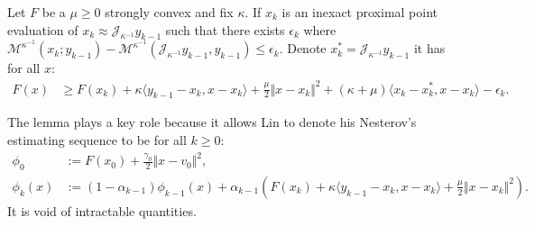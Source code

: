 \documentclass[12pt]{article}
\begin{document}
    \begin{lemma}\label{lemma:lin-ixct-prox-ineq}
        Let $F$ be a $\mu\ge 0$ strongly convex and fix $\kappa$. 
        If $x_k$ is an inexact proximal point evaluation of $x_k \approx \mathcal J_{\kappa^{-1}} y_{k - 1}$ such that there exists $\epsilon_k$ where $\mathcal M^{\kappa^{-1}}(x_k; y_{k - 1}) - \mathcal M^{\kappa^{-1}}(\mathcal J_{\kappa^{-1}} y_{k - 1}, y_{k - 1}) \le \epsilon_k$. 
        Denote $x_k^* = \mathcal J_{\kappa^{-1}} y_{k - 1}$ it has for all $x$: 
        \begin{align*}
            F(x) &\ge 
            F(x_k) + \kappa \langle y_{k - 1} - x_k, x - x_k\rangle
            + \frac{\mu}{2}\Vert x - x_k\Vert^2 
            + (\kappa + \mu)\langle  x_k - x_k^*, x - x_k\rangle 
            - \epsilon_k.
        \end{align*}
    \end{lemma}
    \begin{remark}
        The lemma plays a key role because it allows Lin to denote his Nesterov's estimating sequence to be for all $k \ge0$: 
        \begin{align*}
            \phi_0 &:= F(x_0) + \frac{\gamma_0}{2}\Vert x - v_0\Vert^2, 
            \\
            \phi_k(x) &:= 
            (1 - \alpha_{k - 1})\phi_{k - 1}(x)
            + \alpha_{k - 1}\left(
                F(x_k) + \kappa\langle y_{k - 1} - x_k, x - x_k \rangle
                + \frac{\mu}{2}\Vert x - x_k\Vert^2
            \right). 
        \end{align*}
        It is void of intractable quantities. 
    \end{remark}
    
\end{document}

